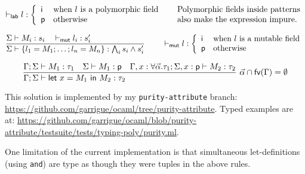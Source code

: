 \documentclass[a4paper]{article}
\let\th\vdash
\let\E\Sigma
\let\G\Gamma
\let\tv\alpha
\let\t\tau
\def\p{\mathsf{p}}
\def\i{\mathsf{i}}
\newcommand\lfrac[2]{\frac{#1\hfill}{#2\hfill}}
\newcommand\mlet[1]{\textsf{let}~#1~\textsf{in}~}
\begin{document}
\[
\th_{\sf lab} l :
\left\{\begin{array}{ll}
\i & \mbox{when $l$ is a polymorphic field} \\
\p & \mbox{otherwise} \\
\end{array}\right.
\quad
\begin{array}{l}
  \mbox{Polymorphic fields inside patterns} \\
  \mbox{also make the expression impure.}
\end{array}
\]

\[
\lfrac{\E \th M_i : s_i \quad \th_{\sf mut} l_i : s'_i}
{\E \th \{l_1 = M_1; \dots; l_n = M_n\} : \bigwedge_i s_i \land s'_i}
\hspace{5ex}
\th_{\sf mut} l :
\left\{\begin{array}{ll}
\i & \mbox{when $l$ is a mutable field} \\
\p & \mbox{otherwise} \\
\end{array}\right.
\]

\[
\lfrac{\G;\E \th M_1 : \t_1  \quad \E \th M_1 : \p \quad
  \G, x : \forall\vec\tv.\t_1; \E,x : \p \th M_2 : \t_2}
{\G;\E \th \mlet{x = M_1} M_2 : \t_2}~ \vec\tv \cap \textsf{fv}(\G) = \emptyset
\]

This solution is implemented by my {\tt purity-attribute} branch:
\url{https://github.com/garrigue/ocaml/tree/purity-attribute}.
Typed examples are at:
\url{https://github.com/garrigue/ocaml/blob/purity-attribute/testsuite/tests/typing-poly/purity.ml}.

One limitation of the current implementation is that simultaneous
let-definitions (using {\tt and}) are type as though they were tuples
in the above rules.
\end{document}
